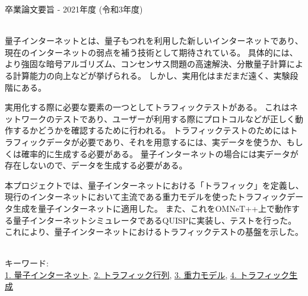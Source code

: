 卒業論文要旨 - 2021年度 (令和3年度)
\begin{center}
\begin{large}
\end{large}
\end{center}

~ \\

量子インターネットとは、量子もつれを利用した新しいインターネットであり、現在のインターネットの弱点を補う技術として期待されている。
具体的には、より強固な暗号アルゴリズム、コンセンサス問題の高速解決、分散量子計算による計算能力の向上などが挙げられる。
しかし、実用化はまだまだ遠く、実験段階にある。

実用化する際に必要な要素の一つとしてトラフィックテストがある。
これはネットワークのテストであり、ユーザーが利用する際にプロトコルなどが正しく動作するかどうかを確認するために行われる。
トラフィックテストのためにはトラフィックデータが必要であり、それを用意するには、実データを使うか、もしくは確率的に生成する必要がある。
量子インターネットの場合には実データが存在しないので、データを生成する必要がある。

本プロジェクトでは、量子インターネットにおける「トラフィック」を定義し、現行のインターネットにおいて主流である重力モデルを使ったトラフィックデータ生成を量子インターネットに適用した。
また、これをOMNeT++上で動作する量子インターネットシミュレータであるQUISPに実装し、テストを行った。
これにより、量子インターネットにおけるトラフィックテストの基盤を示した。

~ \\
キーワード:\\
\underline{1. 量子インターネット},
\underline{2. トラフィック行列},
\underline{3. 重力モデル},
\underline{4. トラフィック生成}
\begin{flushright}
\dept \\
\author
\end{flushright}
